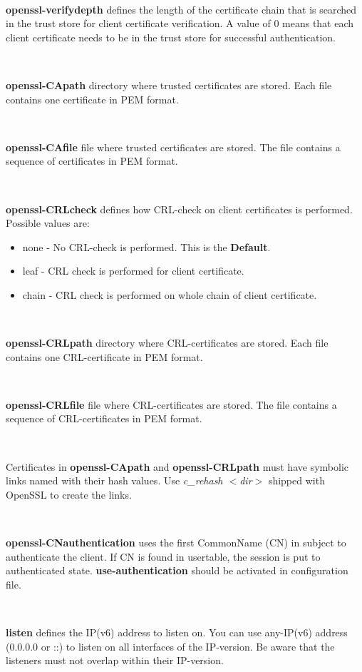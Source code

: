 ~

\textbf{openssl-verifydepth} defines the length of the certificate chain that is searched in the trust store for client certificate verification. A value of 0 means that each client certificate needs to be in the trust store for successful authentication.

~

\textbf{openssl-CApath} directory where trusted certificates are stored. Each file contains one certificate in PEM format.

~

\textbf{openssl-CAfile} file where trusted certificates are stored. The file contains a sequence of certificates in PEM format.

~

\textbf{openssl-CRLcheck} defines how CRL-check on client certificates is performed.
Possible values are:
\begin{itemize}
	\item{none} - No CRL-check is performed. This is the \textbf{Default}.
	\item{leaf} - CRL check is performed for client certificate.
	\item{chain} - CRL check is performed on whole chain of client certificate.
\end{itemize}

~

\textbf{openssl-CRLpath} directory where CRL-certificates are stored. Each file contains one CRL-certificate in PEM format.

~

\textbf{openssl-CRLfile} file where CRL-certificates are stored. The file contains a sequence of CRL-certificates in PEM format.

~

Certificates in \textbf{openssl-CApath} and \textbf{openssl-CRLpath} must have symbolic links named with their hash values. 
Use \textit{c\_rehash $<$dir$>$} shipped with OpenSSL to create the links.

~

\textbf{openssl-CNauthentication} uses the first CommonName (CN) in subject to authenticate the client. If CN is found in usertable, the session is put to authenticated state.
\textbf{use-authentication} should be activated in configuration file.

~

\textbf{listen} defines the IP(v6) address to listen on. You can use any-IP(v6) address (0.0.0.0 or ::) to listen on all interfaces of the IP-version. Be aware that the listeners must not overlap within their IP-version.

